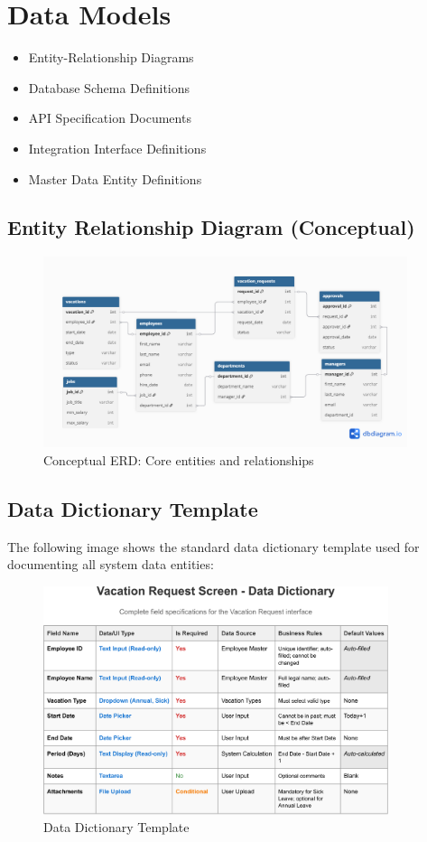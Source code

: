 \documentclass[12pt,a4paper]{article}
\begin{document}
\section{Data Models}
\begin{itemize}
    \item Entity-Relationship Diagrams
    \item Database Schema Definitions
    \item API Specification Documents
    \item Integration Interface Definitions
    \item Master Data Entity Definitions
\end{itemize}

\subsection{Entity Relationship Diagram (Conceptual)}
\begin{figure}[H]
\centering
\includegraphics[width=0.95\textwidth]{Diagrams/Entity-Relationship/Entity-Relationship.png}
\caption{Conceptual ERD: Core entities and relationships}
\label{fig:conceptual-erd}
\end{figure}

\subsection{Data Dictionary Template}
The following image shows the standard data dictionary template used for documenting all system data entities:

\begin{figure}[H]
\centering
\includegraphics[width=0.9\textwidth]{Data-Dictionary/Data-Dictionary-Template/Data-Dictionary-Template-1.png}
\caption{Data Dictionary Template}
\label{fig:data-dictionary-template}
\end{figure}
\end{document}
